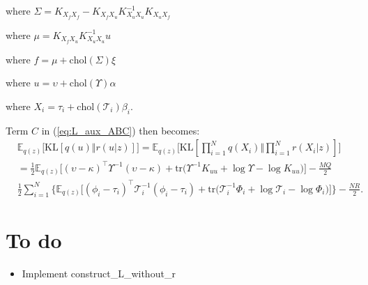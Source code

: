 \documentclass[12pt]{article}
\newcommand{\Tau}{\mathcal{T}}
\newcommand{\Kff}{K_{X_fX_f}}
\newcommand{\Kuu}{K_{X_uX_u}}
\newcommand{\Kuf}{K_{X_uX_f}}
\newcommand{\Kfu}{K_{X_fX_u}}
\newcommand{\chol}{\mathrm{chol}}
\begin{document}
where $\Sigma = \Kff - \Kfu\Kuu^{-1}\Kuf$

where $\mu   = \Kfu\Kuu^{-1}u$

where $f = \mu + \chol(\Sigma)\xi $

where $u = \upsilon + \chol(\Upsilon)\alpha$

where $X_i = \tau_i + \chol(\Tau_i)\beta_i$.

Term $C$ in (\ref{eq:L_aux_ABC}) then becomes:
%
\begin{align}
    &\mathbb{E}_{q(z)}\big[ \text{KL}[q(u)\Vert r(u|z)] \big] = \mathbb{E}_{q(z)}\big[ \text{KL}[\prod_{i=1}^Nq(X_i)\Vert \prod_{i=1}^Nr(X_i|z)] \big]\\
    &= \frac{1}{2}\mathbb{E}_{q(z)}\big[ (\upsilon - \kappa)^\top\Upsilon^{-1}(\upsilon - \kappa) + \text{tr}\big( \Upsilon^{-1}K_{uu} + \log\Upsilon - \log K_{uu} \big) \big] - \frac{MQ}{2}\\
    &\frac{1}{2}\sum_{i=1}^N \big\{ \mathbb{E}_{q(z)}\big[ (\phi_i - \tau_i)^\top\Tau_i^{-1}(\phi_i - \tau_i) + \text{tr}\big( \Tau_i^{-1}\Phi_i + \log\Tau_i - \log\Phi_i \big) \big] \big\} - \frac{NR}{2}.
\end{align}

\section{To do}

\begin{itemize}
    \item Implement construct_L_without_r
\end{itemize}
\end{document}
